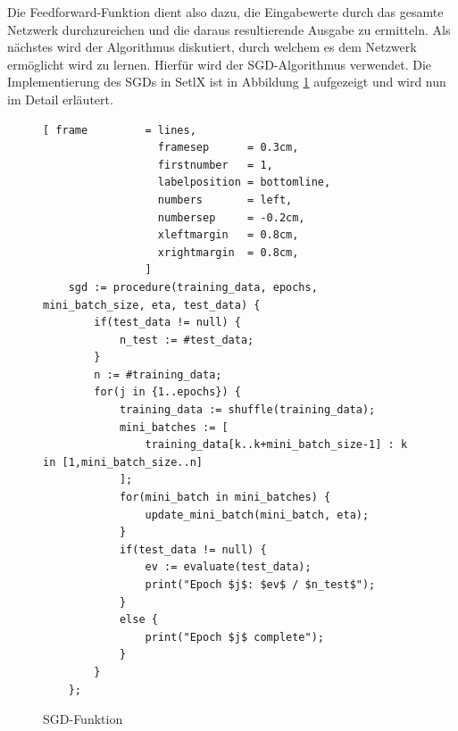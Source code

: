 \noindent
Die Feedforward-Funktion dient also dazu, die Eingabewerte durch das gesamte Netzwerk durchzureichen und die daraus resultierende Ausgabe zu ermitteln. Als nächstes wird der Algorithmus diskutiert, durch welchem es dem Netzwerk ermöglicht wird zu \glqq lernen\grqq. Hierfür wird der SGD-Algorithmus verwendet. Die Implementierung des SGDs in SetlX ist in Abbildung \ref{fig:sgd_func} aufgezeigt und wird nun im Detail erläutert.

\begin{figure}
\begin{Verbatim}[ frame         = lines, 
                  framesep      = 0.3cm, 
                  firstnumber   = 1,
                  labelposition = bottomline,
                  numbers       = left,
                  numbersep     = -0.2cm,
                  xleftmargin   = 0.8cm,
                  xrightmargin  = 0.8cm,
                ]
    sgd := procedure(training_data, epochs, mini_batch_size, eta, test_data) {
        if(test_data != null) {
            n_test := #test_data; 		
        }
        n := #training_data;		
        for(j in {1..epochs}) {
            training_data := shuffle(training_data);
            mini_batches := [ 
                training_data[k..k+mini_batch_size-1] : k in [1,mini_batch_size..n] 
            ];		
            for(mini_batch in mini_batches) {
                update_mini_batch(mini_batch, eta);
            } 		
            if(test_data != null) {
                ev := evaluate(test_data);
                print("Epoch $j$: $ev$ / $n_test$");
            }
            else {
                print("Epoch $j$ complete");
            }
        }
    };
\end{Verbatim}
\vspace*{-0.3cm}
\caption{SGD-Funktion}
\label{fig:sgd_func}
\end{figure}
